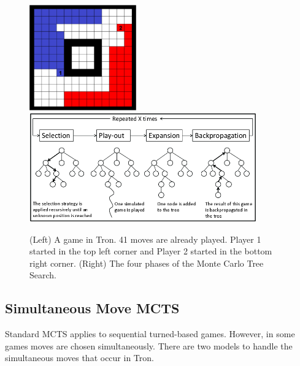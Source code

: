 \documentclass{article}
\begin{document}
\begin{figure}[t]
\begin{center}
\includegraphics[width=4.6cm]{images/tron_field.png} \hspace{0.4cm} \includegraphics[width=9.8cm]{images/mcts_figure.png}
\caption{(Left) A game in Tron. 41 moves are already played. Player 1 started in the top left corner and Player 2 started in the bottom right corner.
 (Right) The four phases of the Monte Carlo Tree Search. \label{fig:tron-mcts}}
\end{center}
\end{figure}


\subsection{Simultaneous Move MCTS}



Standard MCTS applies to sequential turned-based games. However, in some games moves are chosen simultaneously. 
There are two models to handle the simultaneous moves that occur in Tron. 
\end{document}

